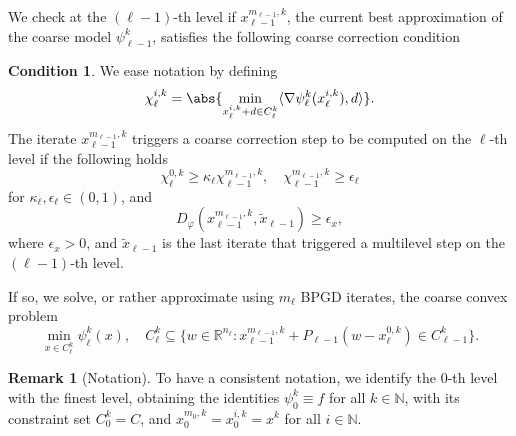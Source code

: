 \documentclass[11pt,reqno]{amsart}
\numberwithin{equation}{section}
\numberwithin{figure}{section}
\theoremstyle{plain}
\theoremstyle{definition}
\newtheorem{condition}[theorem]{Condition}
\newtheorem{remark}[theorem]{Remark}
\newcommand{\N}{\mathbb{N}}
\newcommand{\R}{\mathbb{R}}
\newcommand{\la}{\langle}
\newcommand{\ra}{\rangle}
\newcommand{\vphi}{\varphi}
\newcommand{\df}{\nabla f}
\begin{document}
We check at the $(\ell-1)$-th level if $x_{\ell-1}^{m_{\ell-1}, k}$, the current best approximation of the coarse model $\psi_{\ell-1}^k$, satisfies the following coarse correction condition
\begin{condition}
    We ease notation by defining
    \begin{equation}
        \chi_\ell^{i,k} = \abs{ \min_{x_\ell^{i,k} + d \in C_\ell^k} \la \nabla \psi_\ell^k(x_\ell^{i,k}), d \ra}.
    \end{equation}
    The iterate $x_{\ell-1}^{m_{\ell-1},k}$ triggers a coarse correction step to be computed on the $\ell$-th level if the following holds
    \begin{equation}
        \chi_\ell^{0,k} \geq \kappa_\ell \chi_{\ell-1}^{m_{\ell-1},k}, \quad \chi_{\ell-1}^{m_{\ell-1},k} \geq \epsilon_\ell
    \end{equation}
    for $\kappa_\ell, \epsilon_\ell \in (0,1)$, and
\begin{equation}
    D_\vphi(x^{m_{\ell-1},k}_{\ell-1} ,\widetilde{x}_{\ell-1}) \geq \epsilon_x,
\end{equation}
where $\epsilon_x > 0$, and $\widetilde{x}_{\ell-1}$ is the last iterate that triggered a multilevel step on the $(\ell-1)$-th level.
\end{condition}
If so, we solve, or rather approximate using $m_{\ell}$ BPGD iterates, the coarse convex problem
\begin{equation}
    \min_{x \in C_{\ell}^k} \psi_{\ell}^k(x), \quad C_{\ell}^k \subseteq \{w \in \R^{n_\ell}: x_{\ell-1}^{m_{\ell-1}, k} + P_{\ell-1}(w - x_{\ell}^{0,k}) \in C_{\ell-1}^k \}.
\end{equation}
\begin{remark}[Notation] To have a consistent notation, we identify the $0$-th level with the finest level, obtaining the identities $\psi_{0}^k \equiv f$ for all $k \in \N$, with its constraint set $C_0^k = C$, and $x_0^{m_0,k} = x_{0}^{i,k}=x^k$ for all $i \in \N$.
    
\end{remark}
\end{document}
